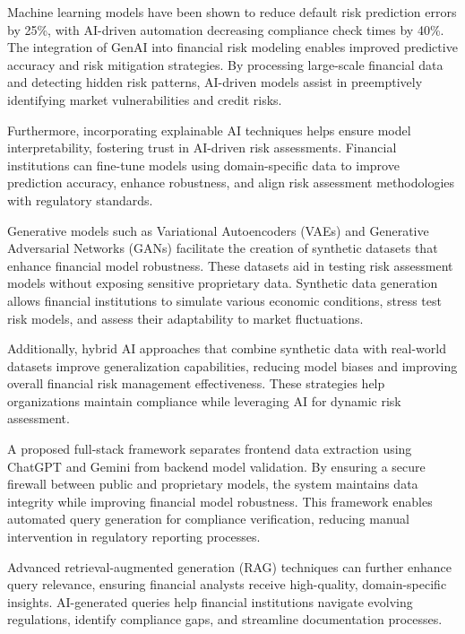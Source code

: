 \documentclass[a4paper,12pt]{scrbook}
\begin{document}
	
	Machine learning models have been shown to reduce default risk prediction errors by 25\%, with AI-driven automation decreasing compliance check times by 40\%. The integration of GenAI into financial risk modeling enables improved predictive accuracy and risk mitigation strategies. By processing large-scale financial data and detecting hidden risk patterns, AI-driven models assist in preemptively identifying market vulnerabilities and credit risks.
	
	Furthermore, incorporating explainable AI techniques helps ensure model interpretability, fostering trust in AI-driven risk assessments. Financial institutions can fine-tune models using domain-specific data to improve prediction accuracy, enhance robustness, and align risk assessment methodologies with regulatory standards.
	
	Generative models such as Variational Autoencoders (VAEs) and Generative Adversarial Networks (GANs) facilitate the creation of synthetic datasets that enhance financial model robustness. These datasets aid in testing risk assessment models without exposing sensitive proprietary data. Synthetic data generation allows financial institutions to simulate various economic conditions, stress test risk models, and assess their adaptability to market fluctuations.
	
	Additionally, hybrid AI approaches that combine synthetic data with real-world datasets improve generalization capabilities, reducing model biases and improving overall financial risk management effectiveness. These strategies help organizations maintain compliance while leveraging AI for dynamic risk assessment.
	
	
	A proposed full-stack framework separates frontend data extraction using ChatGPT and Gemini from backend model validation. By ensuring a secure firewall between public and proprietary models, the system maintains data integrity while improving financial model robustness. This framework enables automated query generation for compliance verification, reducing manual intervention in regulatory reporting processes.
	
	Advanced retrieval-augmented generation (RAG) techniques can further enhance query relevance, ensuring financial analysts receive high-quality, domain-specific insights. AI-generated queries help financial institutions navigate evolving regulations, identify compliance gaps, and streamline documentation processes.
	
\end{document}
